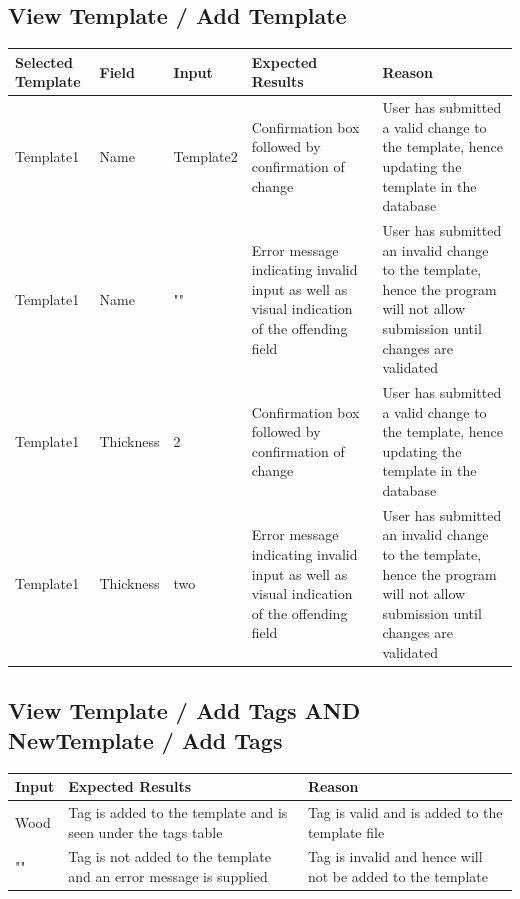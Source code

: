 \documentclass[oneside,openany,11pt,a4paper]{report}
\begin{document}
\subsection{View Template / Add Template}
\begin{longtable}{|p{3cm}|p{3cm}|p{3cm}|p{3cm}|p{3cm}|}
	\hline
	\rowcolor{gray!50}
	\textbf{Selected Template} & \textbf{Field} & \textbf{Input} & \textbf{Expected Results} & \textbf{Reason}\\ \hline
	
	Template1 & Name & Template2 & Confirmation box followed by confirmation of change & User has submitted a valid change to the template, hence updating the template in the database \\ \hline
	
	Template1 & Name & "" & Error message indicating invalid input as well as visual indication of the offending field & User has submitted an invalid change to the template, hence the program will not allow submission until changes are validated \\ \hline
	
	Template1  & Thickness & 2 & Confirmation box followed by confirmation of change & User has submitted a valid change to the template, hence updating the template in the database \\ \hline
	
	Template1 & Thickness & two &Error message indicating invalid input as well as visual indication of the offending field & User has submitted an invalid change to the template, hence the program will not allow submission until changes are validated \\ \hline
\end{longtable}


\subsection{View Template / Add Tags  AND NewTemplate / Add Tags}
\begin{longtable}{|p{3cm}|p{6cm}|p{6cm}|}
	\hline
	\rowcolor{gray!50}
	\textbf{Input} &  \textbf{Expected Results} & \textbf{Reason} \\ \hline
	
	Wood & Tag is added to the template and is seen under the tags table & Tag is valid and is added to the template file \\ \hline
	
	"" & Tag is not added to the template and an error message is supplied & Tag is invalid and hence will not be added to the template \\ \hline
\end{longtable}
\end{document}
